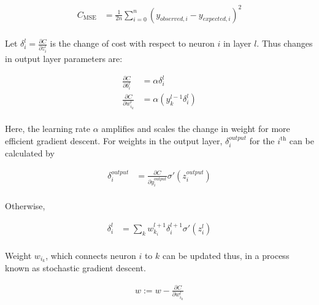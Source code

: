 \documentclass[12pt,a4paper]{book}
\begin{document}
\begin{align*}
  C_{\text{MSE}} &= \frac{1}{2n} \sum_{i=0}^{n} \left(y_{observed, i}- y_{expected, i} \right)^{2}
\end{align*}

\paragraph{} Let $\delta^{l}_{i} = \frac{\partial C}{\partial z^{l}_{i}}$ is the change of cost with respect to neuron $i$ in layer $l$. Thus changes in output layer parameters are:

\begin{align*}
  \frac{\partial C}{\partial b^{l}_{i}} &= \alpha \delta^{l}_{i} \\
  \frac{\partial C}{\partial w^{l}_{i_{k}}} &= \alpha( y^{l-1}_{k} \delta^{l}_{i})
\end{align*}

\paragraph{} Here, the learning rate $\alpha$ amplifies and scales the change in weight for more efficient gradient descent. For weights in the output layer, $\delta^{output}_{i}$ for the $i^{\text{th}}$ can be calculated by

\begin{align*}
  \delta^{output}_{i} &= \frac{\partial C}{\partial y^{output}_{i}} \sigma ' (z^{output}_{i})
\end{align*}

\paragraph{} Otherwise,

\begin{align*}
  \delta^{l}_{i} &= \sum_{k} w^{l+1}_{k_{i}} \delta^{l+1}_{i} \sigma ' (z^{l}_{i})
\end{align*}

\paragraph{} Weight $w_{i_{k}}$, which connects neuron $i$ to $k$ can be updated thus, in a process known as stochastic gradient descent.

\begin{align*}
  w := w - \frac{\partial C}{\partial w^{l}_{i_{k}}}
\end{align*}
\end{document}
